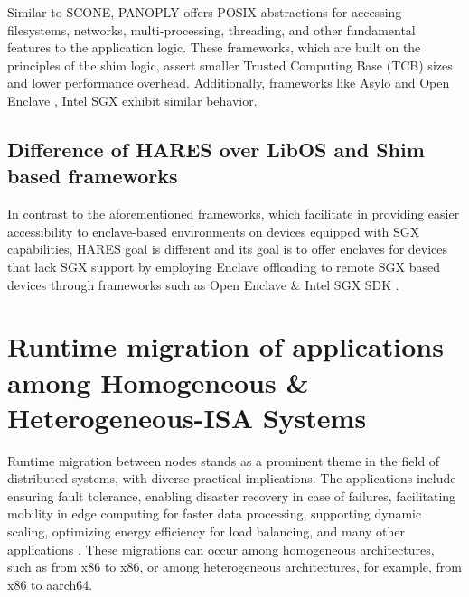 \documentclass[article, doublespace,nopageskip]{VTthesis} %
\newcommand{\monitor}{HARES }
\begin{document}
    Similar to SCONE, PANOPLY \cite{PANOPLY} offers POSIX abstractions for accessing filesystems, networks, multi-processing, threading, and other fundamental features to the application logic. These frameworks, which are built on the principles of the shim logic, assert smaller Trusted Computing Base (TCB) sizes and lower performance overhead.  Additionally, frameworks like Asylo \cite{Asylo} and Open Enclave \cite{Open-Enclave}, Intel SGX \cite{Intel-SGX} exhibit similar behavior.

    \subsection{Difference of \monitor over LibOS and Shim based frameworks}
    In contrast to the aforementioned frameworks, which facilitate in providing easier accessibility to enclave-based environments on devices equipped with SGX capabilities, \monitor goal is different and its goal is to offer enclaves for devices that lack SGX support by employing Enclave offloading to remote SGX based devices through frameworks such as Open Enclave \cite{Open-Enclave} \& Intel SGX SDK \cite{Intel-SGX}. 

    \section{Runtime migration of applications among Homogeneous \& Heterogeneous-ISA Systems} \label{ase: Runtime_migrations}
    Runtime migration between nodes stands as a prominent theme in the field of distributed systems, with diverse practical implications. The applications include ensuring fault tolerance, enabling disaster recovery in case of failures, facilitating mobility in edge computing for faster data processing, supporting dynamic scaling, optimizing energy efficiency for load balancing, and many other applications \cite{CRIUMigration}. These migrations can occur among homogeneous architectures, such as from x86 to x86, or among heterogeneous architectures, for example, from x86 to aarch64.
\end{document}
